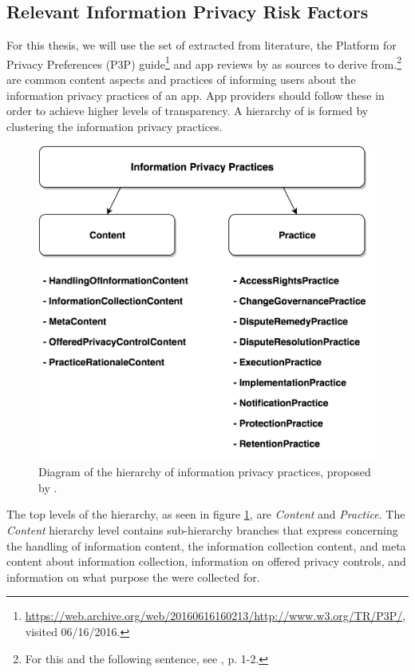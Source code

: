 \subsection{Relevant Information Privacy Risk Factors}\label{chapter:Relevant}

For this thesis, we will use the set of \ipp extracted from literature, the Platform for Privacy Preferences (\acs{P3P}) guide\footnote{\url{https://web.archive.org/web/20160616160213/http://www.w3.org/TR/P3P/}, visited 06/16/2016.} and app reviews by \cite{Dehling2016} as sources to derive \iprfs from.\footnote{For this and the following sentence, see \cite{Dehling2016}, p. 1-2.} 
\Ipp are common content aspects and practices of informing users about the information privacy practices of an app. 
App providers should follow these \ipp in order to achieve higher levels of transparency.
A hierarchy of \ipp is formed by clustering the information privacy practices. 

\begin{figure}[h]
	\centering
	\includegraphics[keepaspectratio=true,width=350pt]{figures/IPP.png}
	\caption{Diagram of the hierarchy of information privacy practices, proposed by \cite{Dehling2016}.}
	\label{fig:informationPrivacyPractices}
\end{figure}

The top levels of the hierarchy, as seen in figure \ref{fig:informationPrivacyPractices}, are \textit{Content} and \textit{Practice}.
The \textit{Content} hierarchy level contains sub-hierarchy branches that express \ipp concerning the handling of information content, the information collection content, and meta content about information collection, information on offered privacy controls, and information on what purpose the \ipp were collected for.

